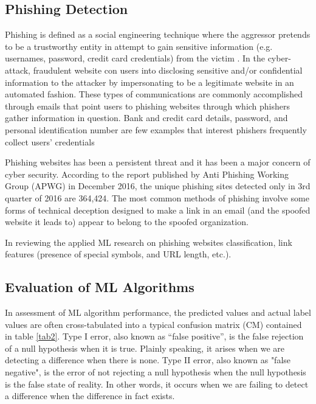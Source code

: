 \documentclass[deca,blindrev]{informs3}
\begin{document}
\subsection{Phishing Detection}
Phishing is defined as a social engineering technique where the aggressor pretends to be a trustworthy entity in attempt to gain sensitive information (e.g. usernames, password, credit card credentials) from the victim \citep{Jagatic2007}. In the cyber-attack, fraudulent website con users into disclosing sensitive and/or confidential information to the attacker by impersonating to be a legitimate website in an automated fashion.  These types of communications are commonly accomplished through emails that point users to phishing websites through which phishers gather information in question.  Bank and credit card details, password, and personal identification number are few examples that interest phishers frequently collect users’ credentials \citep{jakobsson2006phishing}

Phishing websites has been a persistent threat and it has been a major concern of cyber security.  According to the report published by Anti Phishing Working Group (APWG) in December 2016, the unique phishing sites detected only in 3rd quarter of 2016 are 364,424. The most common methods of phishing involve some forms of technical deception designed to make a link in an email (and the spoofed website it leads to) appear to belong to the spoofed organization. 

In reviewing the applied ML research on phishing websites classification,    link features (presence of special symbols, and URL length, etc.).

 



\subsection{Evaluation of ML Algorithms}

In assessment of ML algorithm performance, the predicted  values and actual label values  are often cross-tabulated into  a typical confusion matrix (CM) contained in  table \ref{tab2}. Type I error, also known as “false positive”, is the false rejection of a null hypothesis when it is true. Plainly speaking, it arises when we are detecting a difference when there is none. Type II error, also known as "false negative", is the error of not rejecting a null hypothesis when the null hypothesis is the false state of reality. In other words, it occurs when we are failing to detect a difference when the difference in fact exists.
\end{document}
